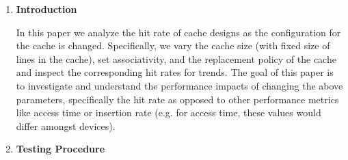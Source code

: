 \documentclass[11pt]{article}
\begin{document}
\begin{enumerate}[left= \parindent, label = \textbf{\arabic*.}]
    \item \textbf{Introduction}
    
    In this paper we analyze the hit rate of cache designs as the configuration for the cache is changed. Specifically, we vary the cache size (with fixed size of lines in the cache), set associativity, and the replacement policy of the cache and inspect the corresponding hit rates for trends. The goal of this paper is to investigate and understand the performance impacts of changing the above parameters, specifically the hit rate as opposed to other performance metrics like access time or insertion rate (e.g. for access time, these values would differ amongst devices).
    \item \textbf{Testing Procedure}
    

\end{enumerate}
\end{document}
